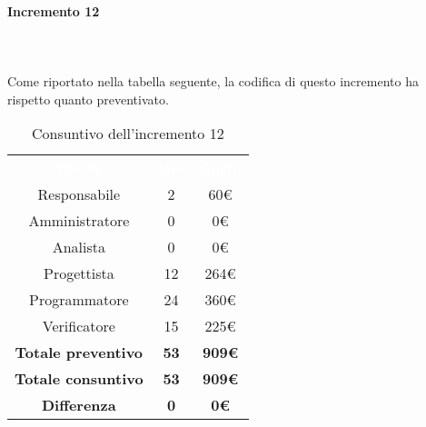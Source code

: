 \paragraph*{Incremento 12} \mbox{} \\ \mbox{} \\
Come riportato nella tabella seguente, la codifica di questo incremento ha rispetto quanto preventivato.
\begin{table}[H]
\centering\renewcommand{\arraystretch}{1.5}
\caption{Consuntivo dell'incremento 12}
\vspace{0.2cm}
\begin{tabular}{ c c c }
\rowcolor{redafk}
\textcolor{white}{\textbf{Ruolo}} & \textcolor{white}{\textbf{Ore}} &
\textcolor{white}{\textbf{Costo}}  \\
Responsabile 	& 2 & 60€ \\
Amministratore 	& 0 & 0€ \\
Analista 		&  0 & 0€ \\
Progettista		&  12 & 264€ \\
Programmatore	&  24 & 360€ \\
Verificatore 	&  15 & 225€ \\
\textbf{Totale preventivo} & \textbf{53} & \textbf{909€}  \\
\textbf{Totale consuntivo} & \textbf{53} & \textbf{909€}  \\
\rowcolor{lastrowcolor}
\textbf{Differenza} & \textbf{0} & \textbf{0€} \\
\end{tabular}
\end{table}


